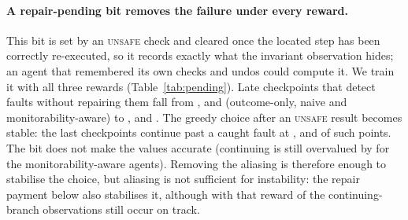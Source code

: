 \paragraph{A repair-pending bit removes the failure under every reward.}
This bit is set by an \textsc{unsafe} check and cleared once the located step has been correctly re-executed, so it records exactly what the invariant observation hides; an agent that remembered its own checks and undos could compute it. We train it with all three rewards (Table~\ref{tab:pending}). Late checkpoints that detect faults without repairing them fall from ,  and  (outcome-only, naive and monitorability-aware) to ,  and . The greedy choice after an \textsc{unsafe} result becomes stable: the last checkpoints continue past a caught fault at ,  and  of such points. The bit does not make the values accurate (continuing is still overvalued by  for the monitorability-aware agents). Removing the aliasing is therefore enough to stabilise the choice, but aliasing is not sufficient for instability: the repair payment below also stabilises it, although with that reward  of the continuing-branch observations still occur on track.

